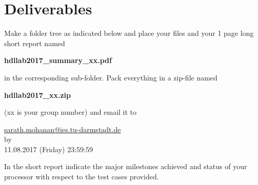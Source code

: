 \newpage
\section{Deliverables}
Make a folder tree as indicated below and place your files and your 1 page long short report named 
\begin{center}
\textbf{hdllab2017\_summary\_xx.pdf}
\end{center}
 in the corresponding sub-folder. Pack everything in a zip-file named 
\begin{center}\textbf{hdllab2017\_xx.zip}
\end{center}
 (xx is your group number) and email it to 
\begin{center}
\href{mailto:sarath.mohanan@ies.tu-darmstadt.de}{sarath.mohanan@ies.tu-darmstadt.de}\\
by\\
11.08.2017 (Friday) 23:59:59
\end{center}
In the short report indicate the major milestones achieved and status of your processor with respect to the test cases provided.

